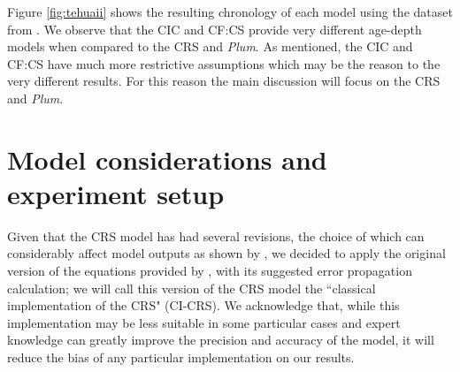 \documentclass [10pt] {article}
\begin{document}
Figure \ref{fig:tehuaii} shows the resulting chronology of each model using the dataset from \citet{Sanchez-Cabeza2012}. 
We observe that the CIC and CF:CS provide very different age-depth models when compared to the CRS and \textit{Plum}. 
As mentioned, the CIC and CF:CS have much more restrictive assumptions which may be the reason to the very different results.
For this reason the main discussion will focus on the CRS and \textit{Plum}.



\section{Model considerations and experiment setup}

Given that the CRS model has had several revisions, the choice of which can considerably affect model outputs as shown by \citet{Barsanti2020}, we decided to apply the original version of the equations provided by \citet{Appleby2001}, with its suggested error propagation calculation; we will call this version of the CRS model the ``classical implementation of the CRS" (CI-CRS). 
We acknowledge that, while this implementation may be less suitable in some particular cases and expert knowledge can greatly improve the precision and accuracy of the model, it will reduce the bias of any particular implementation on our results.

\end{document}
